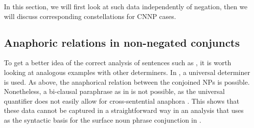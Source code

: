 \documentclass[output=paper]{langsci/langscibook}
\begin{document}
In this section, we will first look at such data independently of negation, then we will discuss corresponding constellations for CNNP cases.


\subsection{Anaphoric relations in non-negated conjuncts}
\label{Sec-Anaphor-Pos}

To get a better idea of the correct analysis of sentences such as , it is worth looking at analogous examples with other determiners.
In , a universal determiner is used. 
As above, the anaphorical relation between the conjoined NPs is possible. 
Nonetheless, a bi-clausal paraphrase as in  is not possible, as the universal quantifier does not easily allow for cross-sentential anaphora \citep{Kamp:81}.
This shows that these data cannot be captured in a straightforward way in an analysis that uses  as the syntactic basis for the surface noun phrase conjunction in .



\ea \label{ex-every-ana}
\begin{xlist}
\label{ex-french-actress}\label{ex-every-anaA}
\label{ex-every-ana-french}
\label{ex-every-anaB}
\end{xlist}
\z 

\end{document}
